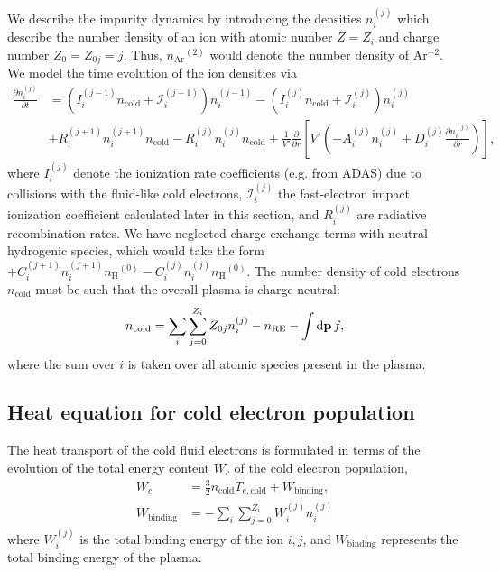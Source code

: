 \documentclass[11pt,a4paper]{article}
\newcommand{\rd}{\ensuremath{\mathrm{d}}}
\newcommand{\sub}[1]{\ensuremath{_{\text{#1}}}}
\renewcommand{\b}[1]{\ensuremath{ {\bf #1 } }}
\begin{document}
We describe the impurity dynamics by introducing the densities $n_i^{(j)}$ which describe the number density of an ion with atomic number $Z = Z_i$ and charge number $Z_0 = Z_{0j} = j$. Thus, $n\sub{Ar}^{(2)}$ would denote the number density of Ar$^{+2}$. We model the time evolution of the ion densities via
\begin{align}
\frac{\partial n_i^{(j)}}{\partial t} &=\left( I_{i}^{(j-1)}n\sub{cold}+\mathcal{I}_i^{(j-1)}\right)n_i^{(j-1)} - \left(I_i^{(j)}n\sub{cold} + \mathcal{I}_i^{(j)}\right)n_i^{(j)}  \nonumber \\
&+ R_i^{(j+1)} n_i^{(j+1)}n\sub{cold} - R_i^{(j)}n_i^{(j)}n\sub{cold}+ \frac{1}{V'}\frac{\partial}{\partial r}\left[V'\left(-A_i^{(j)}n_i^{(j)}+D_i^{(j)}\frac{\partial n_i^{(j)}}{\partial r}\right)\right],
\end{align} 
where $I_i^{(j)}$ denote the ionization rate coefficients (e.g. from ADAS) due to collisions with the fluid-like cold electrons, $\mathcal{I}_i^{(j)}$ the fast-electron impact ionization coefficient calculated later in this section, and $R_i^{(j)}$ are radiative recombination rates.
We have neglected charge-exchange terms with neutral hydrogenic species, which would take the form $+C_{i}^{(j+1)}n_i^{(j+1)}n\sub{H}^{(0)} - C_{i}^{(j)}n_i^{(j)}n\sub{H}^{(0)} $.
The number density of cold electrons $n\sub{cold}$ must be such that the overall plasma is charge neutral:
\begin{align}
n\sub{cold} = \sum_i \sum_{j=0}^{Z_i} Z_{0j} n_i^{(j)} - n\sub{RE} - \int \rd \b{p} \, f,
\end{align}
where the sum over $i$ is taken over all atomic species present in the plasma.  

\subsection{Heat equation for cold electron population}
The heat transport of the cold fluid electrons is formulated in terms of the evolution of the total energy content $W_c$ of the cold electron population, 
\begin{align}
W_c &= \frac{3}{2}n\sub{cold}T_{e,\text{cold}} + W\sub{binding}, \nonumber \\
W\sub{binding} &= -\sum_i \sum_{j=0}^{Z_i} W_i^{(j)} n_i^{(j)}
\end{align}
where $W_i^{(j)}$ is the total binding energy of the ion $i,j$, and $W\sub{binding}$ represents the total binding energy of the plasma. 
\end{document}

